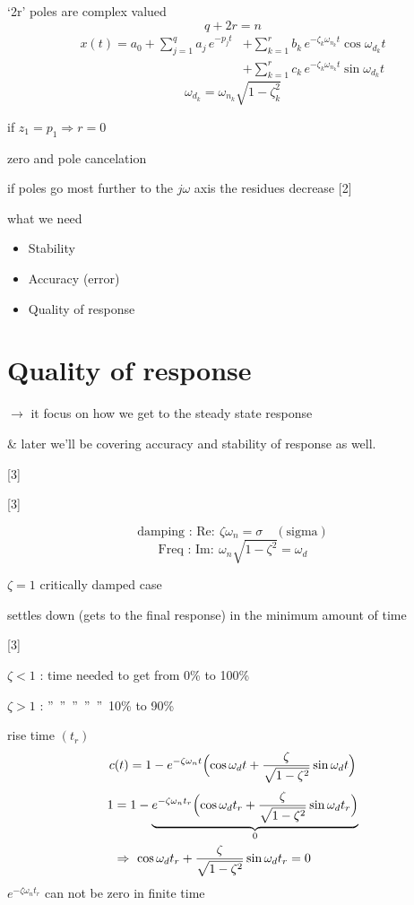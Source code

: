 \documentclass[11pt,a4paper]{article}
\begin{document}
`2r' poles are complex valued
\[ q+2r=n \]
\begin{align*}
x(t)=a_0+\sum_{j=1}^{q}a_j\,e^{-p_j t}&+\sum_{k=1}^{r}b_k\,e^{-\zeta_k\omega_{n_k}t}\cos\omega_{d_k}t\\
&+\sum_{k=1}^{r}c_k\,e^{-\zeta_k\omega_{n_k}t}\sin\omega_{d_k}t
\end{align*}
\[ \omega_{d_k}=\omega_{n_k}\sqrt{1-\zeta_k^2} \]

if $z_1=p_1\Rightarrow r=0$

zero and pole cancelation

if poles go most further to the $j\omega$ axis the residues decrease
[2]

what we need
\begin{itemize}[label={},leftmargin=2em]
\item Stability
\item Accuracy (error)
\item Quality of response
\end{itemize}

\section{Quality of response}
$\to$ it focus on how we get to the steady state response

\& later we'll be covering accuracy and stability of response as well.

[3]

[3]

\[ \text{damping : Re}:\ \zeta\omega_n=\sigma\quad(\text{sigma}) \]
\[ \text{Freq : Im}:\ \omega_n\sqrt{1-\zeta^2}=\omega_d \]

$\zeta=1$ critically damped case

settles down (gets to the final response) in the minimum amount of time

[3]

$\zeta<1$ : time needed to get from 0\% to 100\%

$\zeta>1$ : \textquotedblright\ \textquotedblright\ \textquotedblright\ \textquotedblright\ \textquotedblright\ 10\% to 90\%

rise time $(t_r)$
\[ c(t)=1-e^{-\zeta\omega_n t}\Bigl(\cos\omega_d t+\frac{\zeta}{\sqrt{1-\zeta^2}}\sin\omega_d t\Bigr) \]
\begin{align*}
1&=1-\underbrace{e^{-\zeta\omega_n t_r}\Bigl(\cos\omega_d t_r+\frac{\zeta}{\sqrt{1-\zeta^2}}\sin\omega_d t_r\Bigr)}_{0}\\
&\Rightarrow\ \cos\omega_d t_r+\frac{\zeta}{\sqrt{1-\zeta^2}}\sin\omega_d t_r=0
\end{align*}
$e^{-\zeta\omega_n t_r}$ can not be zero in finite time
\end{document}
